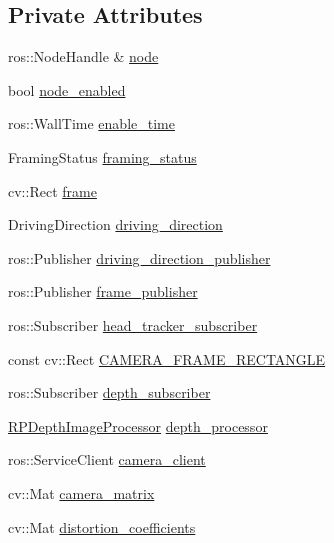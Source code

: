 \subsection*{\-Private \-Attributes}
\begin{DoxyCompactItemize}
\item 
ros\-::\-Node\-Handle \& \hyperlink{class_r_p_framing_node_ada7424816ecc44a22fc3f96eb32ed51d}{node}
\item 
bool \hyperlink{class_r_p_framing_node_a59242d677df9d2ef09ac222c98203a2d}{node\-\_\-enabled}
\item 
ros\-::\-Wall\-Time \hyperlink{class_r_p_framing_node_ac14e461ed967dd726303ff86c7f065e2}{enable\-\_\-time}
\item 
\-Framing\-Status \hyperlink{class_r_p_framing_node_adcfd6823bc9579a1deb6ca6640f44b93}{framing\-\_\-status}
\item 
cv\-::\-Rect \hyperlink{class_r_p_framing_node_a1e4cba34d01b81db86ae54435d98ec76}{frame}
\item 
\-Driving\-Direction \hyperlink{class_r_p_framing_node_a6a5e5171d0d882e21e9caee5977917ed}{driving\-\_\-direction}
\item 
ros\-::\-Publisher \hyperlink{class_r_p_framing_node_a790bcf735ba2a573f27be72ad2c0f1b3}{driving\-\_\-direction\-\_\-publisher}
\item 
ros\-::\-Publisher \hyperlink{class_r_p_framing_node_ae72d8d6735b444261bcb202f928404cc}{frame\-\_\-publisher}
\item 
ros\-::\-Subscriber \hyperlink{class_r_p_framing_node_ae1c216c2215db5cebcf18e1f7a51ae3f}{head\-\_\-tracker\-\_\-subscriber}
\item 
const cv\-::\-Rect \hyperlink{class_r_p_framing_node_a6773f17e9534cc005d5a3f2b749e3e72}{\-C\-A\-M\-E\-R\-A\-\_\-\-F\-R\-A\-M\-E\-\_\-\-R\-E\-C\-T\-A\-N\-G\-L\-E}
\item 
ros\-::\-Subscriber \hyperlink{class_r_p_framing_node_af473bf98f3e2f4653e5aaaec8a11a726}{depth\-\_\-subscriber}
\item 
\hyperlink{class_r_p_depth_image_processor}{\-R\-P\-Depth\-Image\-Processor} \hyperlink{class_r_p_framing_node_a40add69b2b615d2293c8c100606146b6}{depth\-\_\-processor}
\item 
ros\-::\-Service\-Client \hyperlink{class_r_p_framing_node_aedaa9ec0ee3cf711f893fbe242ebc5a8}{camera\-\_\-client}
\item 
cv\-::\-Mat \hyperlink{class_r_p_framing_node_a4a7d5d460e11aece880b5e9836d149dc}{camera\-\_\-matrix}
\item 
cv\-::\-Mat \hyperlink{class_r_p_framing_node_a312c193fe5662a8062a4f6d0918962f8}{distortion\-\_\-coefficients}

\end{DoxyCompactItemize}
